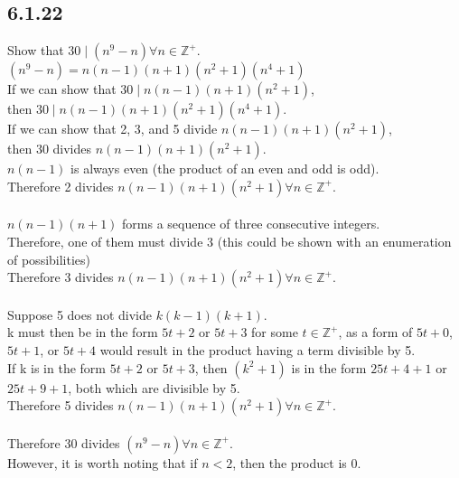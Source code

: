 \documentclass{article}
\begin{document}
\subsection{6.1.22}
Show that $30 \mid (n^9 - n)$\;\;$ \forall n \in \mathbb{Z}^+$.
\\$(n^9 - n) = n(n-1)(n+1)(n^2+1)(n^4+1)$
\\If we can show that $30 \mid n(n-1)(n+1)(n^2+1)$,
\\then $30 \mid n(n-1)(n+1)(n^2+1)(n^4+1)$.
\\If we can show that 2, 3, and 5 divide $n(n-1)(n+1)(n^2+1)$,
\\then 30 divides $n(n-1)(n+1)(n^2+1)$.
\\$n(n-1)$ is always even (the product of an even and odd is odd).
\\Therefore 2 divides $n(n-1)(n+1)(n^2+1)$\;\;$ \forall n \in \mathbb{Z}^+$.
\\
\\$n(n-1)(n+1)$ forms a sequence of three consecutive integers.
\\Therefore, one of them must divide 3
(this could be shown with an enumeration of possibilities)
\\Therefore 3 divides $n(n-1)(n+1)(n^2+1)$\;\;$ \forall n \in \mathbb{Z}^+$.
\\
\\Suppose 5 does not divide $k(k-1)(k+1)$.
\\k must then be in the form $5t+2$ or $5t+3$ for some $t \in \mathbb{Z}^+$,
as a form of $5t+0$, $5t+1$, or $5t+4$
would result in the product having a term divisible by 5.
\\If k is in the form $5t+2$ or $5t+3$, then $(k^2+1)$ is in the form
$25t+4+1$ or $25t+9+1$, both which are divisible by 5.
\\Therefore 5 divides $n(n-1)(n+1)(n^2+1)$\;\;$ \forall n \in \mathbb{Z}^+$.
\\
\\Therefore 30 divides $(n^9 - n)$\;\;$ \forall n \in \mathbb{Z}^+$.
\\However, it is worth noting that if $n<2$, then the product is 0.
\end{document}

